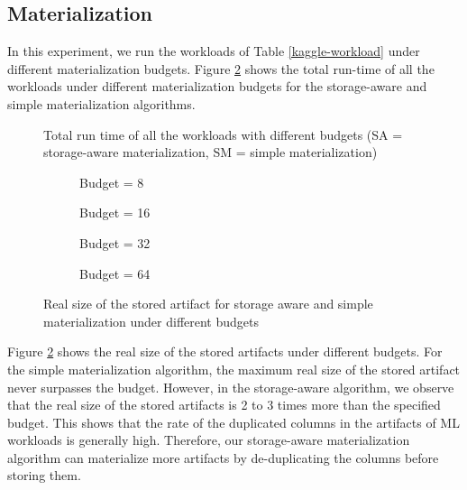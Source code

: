 \subsection{Materialization}
In this experiment, we run the workloads of Table \ref{kaggle-workload} under different materialization budgets.
Figure \ref{exp-sa-vs-simple-size} shows the total run-time of all the workloads under different materialization budgets for the storage-aware and simple materialization algorithms.
\begin{figure}
\centering
 \resizebox{0.5\columnwidth}{!}{%
%
}
\caption{Total run time of all the workloads with different budgets (SA = storage-aware materialization, SM = simple materialization)}
\label{exp-runtime-vs-mat-budget}
\end{figure}

\begin{figure}
\begin{subfigure}[b]{0.5\linewidth}
\centering
 \resizebox{\columnwidth}{!}{%
%
}
\caption{Budget = 8}
\end{subfigure}%
\begin{subfigure}[b]{0.5\linewidth}
\centering
 \resizebox{\columnwidth}{!}{%
%
}

\caption{Budget = 16}
\end{subfigure}
\begin{subfigure}[b]{0.5\linewidth}
\centering
 \resizebox{\columnwidth}{!}{%
%
}

\caption{Budget = 32}
\end{subfigure}%
\begin{subfigure}[b]{0.5\linewidth}
\centering
 \resizebox{\columnwidth}{!}{%
%
}
\caption{Budget = 64}
\end{subfigure}
\caption{Real size of the stored artifact for storage aware and simple materialization under different budgets }
\label{exp-sa-vs-simple-size}
\end{figure}
Figure \ref{exp-sa-vs-simple-size} shows the real size of the stored artifacts under different budgets.
For the simple materialization algorithm, the maximum real size of the stored artifact never surpasses the budget.
However, in the storage-aware algorithm, we observe that the real size of the stored artifacts is 2 to 3 times more than the specified budget.
This shows that the rate of the duplicated columns in the artifacts of ML workloads is generally high.
Therefore, our storage-aware materialization algorithm can materialize more artifacts by de-duplicating the columns before storing them.

